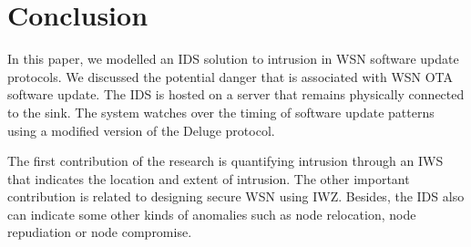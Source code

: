 \documentclass[conference]{IEEEtran}
\begin{document}


\section{Conclusion}
\label{sec:concl}

In this paper, we modelled an IDS solution to intrusion in WSN software update protocols.
We discussed the potential danger that is associated with WSN OTA software update.
The IDS is hosted on a server that remains physically connected to the  sink. 
The system watches over the timing of software update patterns using a modified version of the Deluge protocol.

The first contribution of the research is quantifying intrusion through an IWS that indicates the location and extent of intrusion.
The other important contribution is related to designing secure WSN using IWZ.
Besides, the IDS also can indicate some other kinds of anomalies such as node relocation, node repudiation or node compromise.
\end{document}
